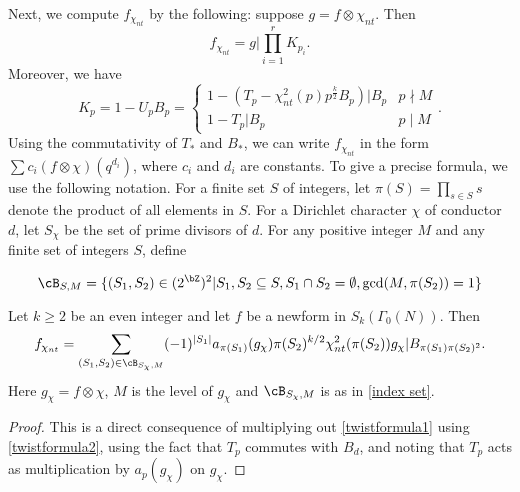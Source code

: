 \documentclass [11pt, proquest] {uwthesis}[2015/03/03]
\begin{document}
Next, we compute $f_{\chi_{nt}}$ by the following: suppose $g  = f \otimes \chi_{nt}$. Then 
\begin{equation} \label{twistformula1}
	f_{\chi_{nt}} =  g |\prod_{i=1}^r K_{p_i}.
\end{equation}
Moreover, we have 
\begin{equation} \label{twistformula2}
K_{p} = 1  - U_{p} B_p =  \begin{cases} 1- (T_p - \chi_{nt}^2(p) p^{\frac{k}{2}} B_p) |B_p & p \nmid M \\  1 - T_p |B_p & p \mid M \end{cases}.
\end{equation} Using the commutativity of $T_*$ and $B_*$, we can write  $f_{\chi_{nt}}$ in the form $\sum c_i (f \otimes \chi)(q^{d_i})$, where $c_i$ and $d_i$ are constants. To give a precise formula, we use the following notation. For a finite set $S$ of integers, let $\pi(S) = \prod_{s \in S} s$ denote the product of all elements in $S$. For a Dirichlet character $\chi$ of conductor $d$, let $S_\chi$ be the set of prime divisors of $d$. For any positive integer $M$ and any finite set of integers $S$, define 

\begin{equation} \label{index set}
\cB_{S,M} = \{(S_1, S_2) \in (2^\bZ)^2 | S_1, S_2 \subseteq S, S_1 \cap S_2 = \emptyset, \gcd(M, \pi(S_2)) = 1\}
\end{equation} 

\begin{Prop} \label{thm: formula1}
Let $k \geq 2$ be an even integer and let $f$ be a newform in $S_k(\Gamma_0(N))$. Then 
	$$f_{\chi_{nt}} =  \sum_{(S_1, S_2) \in \cB_{S_\chi,M}} (-1)^{|S_1|}a_{\pi(S_1)}(g_\chi)  \pi(S_2)^{k/2} \chi_{nt}^2(\pi(S_2)) g_\chi | B_{\pi(S_1) \pi(S_2)^2}.$$
Here $g_\chi = f \otimes \chi$, $M$ is the level of $g_\chi$ and $\cB_{S_\chi,M}$ is as in  \ref{index set}.
\end{Prop}

\begin{proof}
This is a direct consequence of multiplying out \ref{twistformula1} using \ref{twistformula2}, using the fact that $T_p$ commutes with $B_d$, and noting that $T_p$ acts as multiplication by $a_p(g_\chi)$ on $g_\chi$.
\end{proof}
\end{document}
